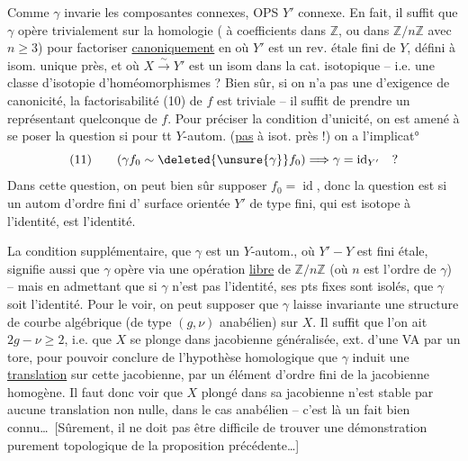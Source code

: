 Comme $\gamma$ invarie les composantes connexes, OPS $Y'$ connexe. En fait, il suffit que $\gamma$ opère trivialement sur la homologie  ( à coefficients dans $\mathbb{Z}$, ou dans  $\mathbb{Z}/n\mathbb{Z}$ avec $n\geq3$) pour
factoriser \uline{canoniquement} en
où $Y'$ est un rev. étale fini de $Y$, défini à isom. unique près, et où $X\xrightarrow{\sim}Y'$ est un isom dans la cat. isotopique -- i.e. une classe d'isotopie d'homéomorphismes ? Bien sûr, si on n'a pas une d'exigence de canonicité, la factorisabilité (10) de $f$ est triviale -- il suffit de prendre un représentant quelconque de $f$.  Pour préciser la  condition d'unicité, on est amené à se poser la question si pour tt $Y$-autom.    (\uline{pas} à isot. près !)  on a l'implicat°
\[
(11)\qquad (\gamma f_0\sim\deleted{\unsure{\gamma}}f_0)\Longrightarrow\gamma=\operatorname{id}_{Y'}\quad ?
\]
Dans cette question, on peut bien sûr supposer $f_0=\operatorname{id}$, donc la question est si un autom d'ordre fini \inserted{$\gamma$} d'  surface orientée $Y'$ de type fini, qui est isotope à l'identité, est l'identité.

La condition supplémentaire, que $\gamma$ est un $Y$-autom., où $Y'\mathbin{-}Y$ est fini étale, signifie aussi que $\gamma$ opère via une opération \uline{libre} de $\mathbb{Z}/n\mathbb{Z}$ (où $n$ est l'ordre de $\gamma$) -- mais en admettant que si $\gamma$  n'est pas l'identité, ses pts fixes sont isolés,
que $\gamma$ soit l'identité. Pour le voir, on peut supposer que $\gamma$ laisse invariante une structure  de courbe algébrique (de type $(g,\nu)$ anabélien) sur $X$. Il suffit  que l'on ait $2g-\nu\geq2$, i.e. que $X$ se plonge dans  jacobienne généralisée, ext. d'une VA par un tore, pour pouvoir conclure de l'hypothèse homologique que $\gamma$  induit une \uline{translation} sur cette jacobienne, par un élément d'ordre fini de la jacobienne homogène. Il faut donc voir que $X$ plongé dans sa jacobienne n'est stable par aucune  translation non nulle, dans le cas anabélien -- c'est là un fait bien connu\ldots\ [Sûrement, il ne doit pas être difficile de trouver une démonstration purement topologique de la proposition précédente\ldots]

